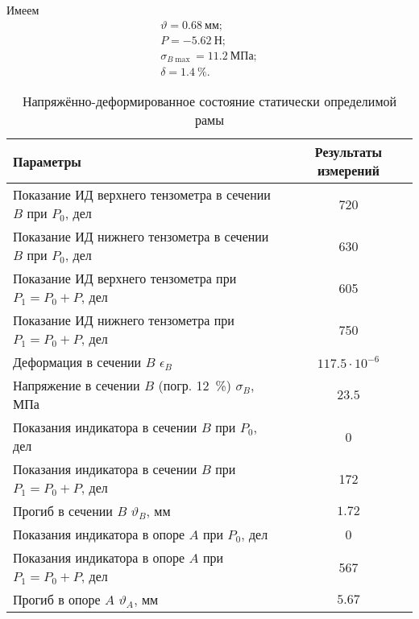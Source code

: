 Имеем
\begin{align*}
    \vartheta = 0.68~мм; \\
    P = -5.62~Н; \\
    \sigma_{B \max} = 11.2~МПа; \\
    \delta = 1.4~\%.
\end{align*}

\begin{table}[H]
    \centering
    \caption{Напряжённо-деформированное состояние статически определимой рамы}
    \label{tab:static-definable-beam}
    \begin{tabular}{|l|c|}
        \hline
        Параметры                                                     & Результаты измерений  \\ \hline
        Показание ИД верхнего тензометра в сечении $B$ при $P_0$, дел & 720                   \\ \hline
        Показание ИД нижнего тензометра в сечении $B$ при $P_0$, дел  & 630                   \\ \hline
        Показание ИД верхнего тензометра при $P_1 = P_0 + P$, дел     & 605                   \\ \hline
        Показание ИД нижнего тензометра при $P_1 = P_0 + P$, дел      & 750                   \\ \hline
        Деформация в сечении $B$ $\epsilon_B$                         & $117.5 \cdot 10^{-6}$ \\ \hline
        Напряжение в сечении $B$ (погр. 12~\%) $\sigma_B$, МПа        & $23.5$                \\ \hline
        Показания индикатора в сечении $B$ при $P_0$, дел             & 0                     \\ \hline
        Показания индикатора в сечении $B$ при $P_1 = P_0 + P$, дел   & 172                   \\ \hline
        Прогиб в сечении $B$ $\vartheta_B$, мм                        & $1.72$                \\ \hline
        Показания индикатора в опоре $A$ при $P_0$, дел               & 0                     \\ \hline
        Показания индикатора в опоре $A$ при $P_1 = P_0 + P$, дел     & 567                   \\ \hline
        Прогиб в опоре $A$ $\vartheta_A$, мм                          & $5.67$                \\ \hline
    \end{tabular}
\end{table}

